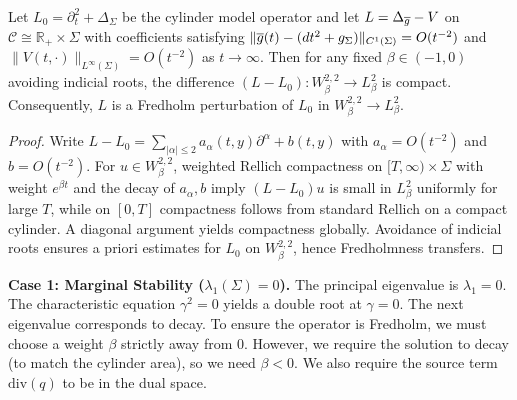 \begin{lemma}
Let $L_0=\partial_t^2+\Delta_\Sigma$ be the cylinder model operator and let $L=\Delta_{\overline{g}}-V$ on $\mathcal{C}\cong\mathbb{R}_+\times\Sigma$ with coefficients satisfying
$\|\overline{g}(t)- (dt^2+g_\Sigma)\|_{C^1(\Sigma)}=O(t^{-2})$ and $\|V(t,\cdot)\|_{L^\infty(\Sigma)}=O(t^{-2})$ as $t\to\infty$. Then for any fixed $\beta\in(-1,0)$ avoiding indicial roots, the difference $(L-L_0):W^{2,2}_\beta\to L^2_\beta$ is compact. Consequently, $L$ is a Fredholm perturbation of $L_0$ in $W^{2,2}_\beta\to L^2_\beta$.
\end{lemma}
\begin{proof}
Write $L-L_0=\sum_{|\alpha|\le 2} a_\alpha(t,y)\partial^\alpha + b(t,y)$ with $a_\alpha=O(t^{-2})$ and $b=O(t^{-2})$. For $u\in W^{2,2}_\beta$, weighted Rellich compactness on $[T,\infty)\times\Sigma$ with weight $e^{\beta t}$ and the decay of $a_\alpha,b$ imply $(L-L_0)u$ is small in $L^2_\beta$ uniformly for large $T$, while on $[0,T]$ compactness follows from standard Rellich on a compact cylinder. A diagonal argument yields compactness globally. Avoidance of indicial roots ensures a priori estimates for $L_0$ on $W^{2,2}_\beta$, hence Fredholmness transfers.
\end{proof}

\textbf{Case 1: Marginal Stability ($\lambda_1(\Sigma)=0$).}
The principal eigenvalue is $\lambda_1=0$. The characteristic equation $\gamma^2 = 0$ yields a double root at $\gamma = 0$. The next eigenvalue corresponds to decay. To ensure the operator is Fredholm, we must choose a weight $\beta$ strictly away from 0.
However, we require the solution to decay (to match the cylinder area), so we need $\beta < 0$. We also require the source term $\text{div}(q)$ to be in the dual space.

